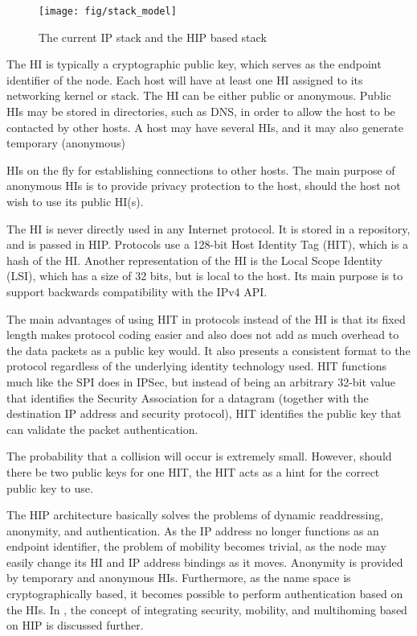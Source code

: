 \begin{figure}[htb]
\begin{center}
\texttt{[image: fig/stack\_model]}
\end{center}
\caption{The current IP stack and the HIP based stack}
\label{fig:stack_model}
\end{figure}

The HI is typically a cryptographic public key, which serves as the
endpoint identifier of the node. Each host will have at least one HI
assigned to its networking kernel or stack. The HI can be either
public or anonymous. Public HIs may be stored in directories, such as
DNS, in order to allow the host to be contacted by other hosts. A host
may have several HIs, and it may also generate temporary (anonymous)

HIs on the fly for establishing connections to other hosts. The main
purpose of anonymous HIs is to provide privacy protection to the host,
should the host not wish to use its public HI(s).

The HI is never directly used in any Internet protocol. It is stored
in a repository, and is passed in HIP. Protocols use a 128-bit Host
Identity Tag (HIT), which is a hash of the HI.  Another representation
of the HI is the Local Scope Identity (LSI), which has a size of 32
bits, but is local to the host. Its main purpose is to support
backwards compatibility with the IPv4 API.

The main advantages of using HIT in protocols instead of the HI is
that its fixed length makes protocol coding easier and also does not
add as much overhead to the data packets as a public key would. It
also presents a consistent format to the protocol regardless of the
underlying identity technology used. HIT functions much like the SPI
does in IPSec, but instead of being an arbitrary 32-bit value that
identifies the Security Association for a datagram (together with the
destination IP address and security protocol), HIT identifies the
public key that can validate the packet authentication.

The probability that a collision will occur is extremely
small. However, should there be two public keys for one HIT, the HIT
acts as a hint for the correct public key to use.

The HIP architecture basically solves the problems of dynamic
readdressing, anonymity, and authentication. As the IP address no
longer functions as an endpoint identifier, the problem of mobility
becomes trivial, as the node may easily change its HI and IP address
bindings as it moves. Anonymity is provided by temporary and anonymous
HIs. Furthermore, as the name space is cryptographically based, it
becomes possible to perform authentication based on the HIs. In
\cite{ndss-inthip}, the concept of integrating security, mobility, and
multihoming based on HIP is discussed further.


